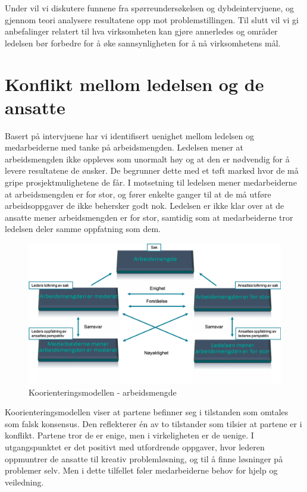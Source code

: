 Under vil vi diskutere funnene fra spørreundersøkelsen og dybdeintervjuene, og gjennom teori analysere resultatene opp mot problemstillingen. Til slutt vil vi gi anbefalinger relatert til hva virksomheten kan gjøre annerledes og områder ledelsen bør forbedre for å øke sannsynligheten for å nå virksomhetens mål.

\section{Konflikt mellom ledelsen og de ansatte}
Basert på intervjuene har vi identifisert uenighet mellom ledelsen og medarbeiderne med tanke på arbeidsmengden. Ledelsen mener at arbeidsmengden ikke oppleves som unormalt høy og at den er nødvendig for å levere resultatene de ønsker. De begrunner dette med et tøft marked hvor de må gripe prosjektmulighetene de får. I motsetning til ledelsen mener medarbeiderne at arbeidsmengden er for stor, og fører enkelte ganger til at de må utføre arbeidsoppgaver de ikke behersker godt nok. Ledelsen er ikke klar over at de ansatte mener arbeidsmengden er for stor, samtidig som at medarbeiderne tror ledelsen deler samme oppfatning som dem.

\begin{figure}[H]
\centering
\includegraphics [scale=0.6]{bilder/koo.png}
\caption{Koorienteringsmodellen - arbeidsmengde}
\label{fig:koo}
\end{figure}

Koorienteringsmodellen viser at partene befinner seg i tilstanden som omtales som falsk konsensus. Den reflekterer én av to tilstander som tilsier at partene er i konflikt. Partene tror de er enige, men i virkeligheten er de uenige. I utgangspunktet er det positivt med utfordrende oppgaver, hvor lederen oppmuntrer de ansatte til kreativ problemløsning, og til å finne løsninger på problemer selv. Men i dette tilfellet føler medarbeiderne behov for hjelp og veiledning.

